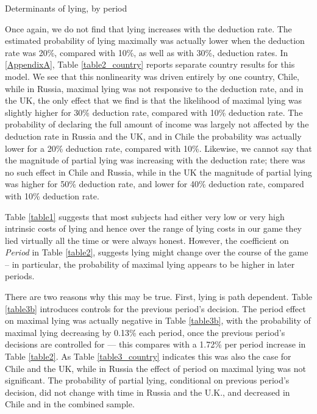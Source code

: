 \documentclass[12pt]{article}
\begin{document}
\begin{table}[ht]\scriptsize
\begin{center}



\end{center}
\caption{Determinants of lying, by period}
\label{table2}
\end{table}

\par Once again, we do not find that lying increases with the deduction rate. The estimated probability of lying maximally was actually lower when the deduction rate was 20\%, compared with 10\%, as well as with 30\%, deduction rates. In \ref{AppendixA}, Table \ref{table2_country} reports separate country results for this model.  We see that this nonlinearity was driven entirely by one country, Chile, while in Russia, maximal lying was not responsive to the deduction rate, and in the UK, the only effect that we find is that the likelihood of maximal lying was slightly higher for 30\% deduction rate, compared with 10\% deduction rate.
The probability of declaring the full amount of income was largely not affected by the deduction rate in Russia and the UK, and in Chile the probability was actually lower for a 20\% deduction rate, compared with 10\%. Likewise, we cannot say that the magnitude of partial lying was increasing with the deduction rate; there was no such effect in Chile and Russia, while in the UK the magnitude of partial lying was higher for 50\% deduction rate, and lower for 40\% deduction rate, compared with 10\% deduction rate. 

\par Table \ref{table1} suggests that most subjects had either very low or very high intrinsic costs of lying and hence over the range of lying costs in our game they lied virtually all the time or were always honest. However, the coefficient on {\it Period} in  Table \ref{table2}, suggests lying might change over the course of the game -- in particular, the probability of maximal lying appears to be higher in later periods. 

\par There are two reasons why this may be true. First, lying is path dependent.  Table \ref{table3b} introduces controls for the previous period's decision. The period effect on maximal lying was actually negative in Table \ref{table3b}, with the probability of maximal lying decreasing by 0.13\% each period, once the previous period's decisions are controlled for --- this compares with a 1.72\% per period increase in Table \ref{table2}. 
As Table \ref{table3_country} indicates this was also the case for Chile and the UK, while in Russia the effect of period on maximal lying was not significant.  
The probability of partial lying, conditional on previous period's decision, did not change with time in Russia and the U.K., and decreased in Chile and in the combined sample. 
\end{document}
